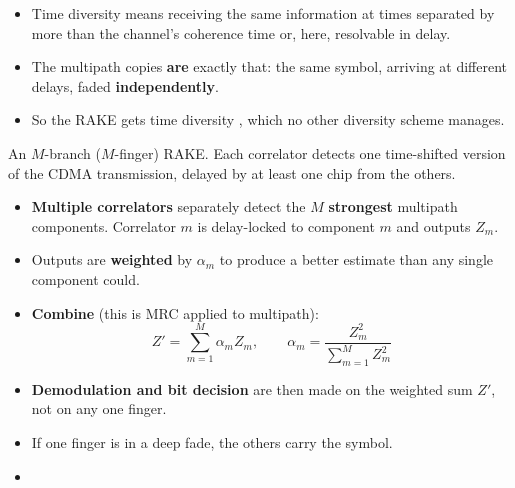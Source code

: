 {
\begin{itemize}
  \item Time diversity means receiving the same information at times separated by more than the
        channel's coherence time or, here, resolvable in delay.
  \item The multipath copies \textbf{are} exactly that: the same symbol, arriving at different
        delays, faded \textbf{independently}.
  \item So the RAKE gets time diversity ,
        which no other diversity scheme manages.
\end{itemize}}{%
\vspace{1pt}
{\color{sub}\footnotesize An $M$-branch ($M$-finger) RAKE. Each correlator detects one time-shifted
version of the CDMA transmission, delayed by at least one chip from the others.}

\begin{itemize}
  \item \textbf{Multiple correlators} separately detect the $M$ \textbf{strongest} multipath
        components. Correlator $m$ is delay-locked to component $m$ and outputs $Z_m$.
  \item Outputs are \textbf{weighted} by $\alpha_m$ to produce a better estimate than any single
        component could.
  \item \textbf{Combine} (this is MRC applied to multipath):
        \[ Z' = \sum_{m=1}^{M}\alpha_m Z_m, \qquad
           \alpha_m = \frac{Z_m^{2}}{\displaystyle\sum_{m=1}^{M} Z_m^{2}} \]
  \item \textbf{Demodulation and bit decision} are then made on the weighted sum $Z'$, not on any
        one finger.
  \item If one finger is in a deep fade, the others carry the symbol.
  \item {}
\end{itemize}}

{\color{sub}\footnotesize {} }

